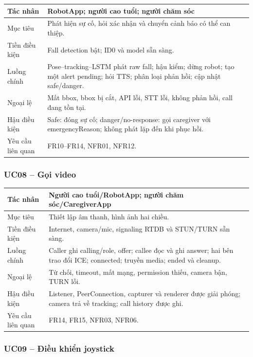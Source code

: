 \begin{longtable}{|p{3.3cm}|p{10.1cm}|}
\hline
Tác nhân & RobotApp; người cao tuổi; người chăm sóc \\
\hline
Mục tiêu & Phát hiện sự cố, hỏi xác nhận và chuyển cảnh báo có thể can thiệp. \\
\hline
Tiền điều kiện & Fall detection bật; ID0 và model sẵn sàng. \\
\hline
Luồng chính & Pose--tracking--LSTM phát raw fall; hậu kiểm; dừng robot; tạo một alert pending; hỏi TTS; phân loại phản hồi; cập nhật safe/danger. \\
\hline
Ngoại lệ & Mất bbox, bbox bị cắt, API lỗi, STT lỗi, không phản hồi, call đang tồn tại. \\
\hline
Hậu điều kiện & Safe: đóng sự cố; danger/no-response: gọi caregiver với emergencyReason; không phát lặp đến khi phục hồi. \\
\hline
Yêu cầu liên quan & FR10--FR14, NFR01, NFR12. \\
\hline
\end{longtable}

\subsubsection*{UC08 -- Gọi video}

\begin{longtable}{|p{3.3cm}|p{10.1cm}|}
\hline
Tác nhân & Người cao tuổi/RobotApp; người chăm sóc/CaregiverApp \\
\hline
Mục tiêu & Thiết lập âm thanh, hình ảnh hai chiều. \\
\hline
Tiền điều kiện & Internet, camera/mic, signaling RTDB và STUN/TURN sẵn sàng. \\
\hline
Luồng chính & Caller ghi calling/role, offer; callee đọc và ghi answer; hai bên trao đổi ICE; connected; truyền media; ended và cleanup. \\
\hline
Ngoại lệ & Từ chối, timeout, mất mạng, permission thiếu, camera bận, TURN lỗi. \\
\hline
Hậu điều kiện & Listener, PeerConnection, capturer và renderer được giải phóng; camera trả về tracking; call history được ghi. \\
\hline
Yêu cầu liên quan & FR14, FR15, NFR03, NFR06. \\
\hline
\end{longtable}

\subsubsection*{UC09 -- Điều khiển joystick}

